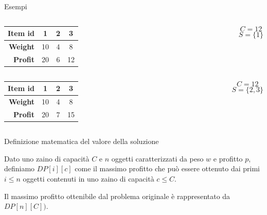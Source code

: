 \begin{frame}{Esempi}

\vspace{-9pt}

\begin{columns}[T]
\begin{tabular}{|r|c|c|c|}
\hline
\textbf{Item id} & \textbf{1} & \textbf{2} & \textbf{3} \\\hline
\textbf{Weight} & 10 & 4 & 8 \\\hline
\textbf{Profit} & 20 & 6 & 12 \\\hline 
\end{tabular} 
\[C=12\]
\pause
{}
\[S = \{1 \}\]
\end{columns}

\smallskip
{}

\pause
\smallskip
{}

\begin{columns}[T]
\begin{tabular}{|r|c|c|c|}
\hline
\textbf{Item id} & \textbf{1} & \textbf{2} & \textbf{3} \\\hline
\textbf{Weight} & 10 & 4 & 8 \\\hline
\textbf{Profit} & 20 & 7 & 15 \\\hline 
\end{tabular}
\[C=12\]
\pause
{}
\[S = \{ 2,3 \}\]
\end{columns}
\end{frame}

\begin{frame}{Definizione matematica del valore della soluzione}

\vspace{-9pt}
\begin{myboxtitle}
Dato uno zaino di capacità $C$ e $n$ oggetti caratterizzati
da peso $w$ e profitto $p$, definiamo $\mathit{DP}[i][c]$ come il
massimo profitto che può essere ottenuto dai primi $i \leq n$
oggetti contenuti in uno zaino di capacità $c \leq C$.
\end{myboxtitle}

\begin{myboxtitle}
Il massimo profitto ottenibile dal problema originale è rappresentato da $\mathit{DP}[n][C])$.
\end{myboxtitle}

\end{frame}


